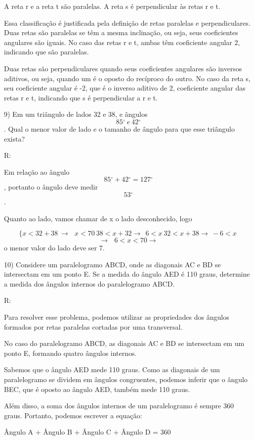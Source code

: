A reta r e a reta t são paralelas. A reta s é perpendicular às retas r e
t.

Essa classificação é justificada pela definição de retas paralelas e
perpendiculares. Duas retas são paralelas se têm a mesma inclinação, ou
seja, seus coeficientes angulares são iguais. No caso das retas r e t,
ambas têm coeficiente angular 2, indicando que são paralelas.

Duas retas são perpendiculares quando seus coeficientes angulares são
inversos aditivos, ou seja, quando um é o oposto do recíproco do outro.
No caso da reta s, seu coeficiente angular é -2, que é o inverso aditivo
de 2, coeficiente angular das retas r e t, indicando que s é
perpendicular a r e t.

9) Em um triângulo de lados 32 e 38, e ângulos
\[85{^\circ}\ e\ 42{^\circ}\]. Qual o menor valor de lado e o tamanho de
ângulo para que esse triângulo exista?

R:

Em relação ao ângulo \[85{^\circ} + 42{^\circ} = 127{^\circ}\], portanto
o ângulo deve medir \[53{^\circ}\].

Quanto ao lado, vamos chamar de x o lado desconhecido, logo

\[\{ x < 32 + 38\  \rightarrow \ \ \ x < 70\ 38 < x + 32 \rightarrow \ \ 6 < x\ 32 < x + 38 \rightarrow \  - 6 < x\ \]
\[\rightarrow \ \ \ 6 < x < 70 \rightarrow\] o menor valor do lado deve
ser 7.

10) Considere um paralelogramo ABCD, onde as diagonais AC e BD se
intersectam em um ponto E. Se a medida do ângulo AED é 110 graus,
determine a medida dos ângulos internos do paralelogramo ABCD.

R:

Para resolver esse problema, podemos utilizar as propriedades dos
ângulos formados por retas paralelas cortadas por uma transversal.

No caso do paralelogramo ABCD, as diagonais AC e BD se intersectam em um
ponto E, formando quatro ângulos internos.

Sabemos que o ângulo AED mede 110 graus. Como as diagonais de um
paralelogramo se dividem em ângulos congruentes, podemos inferir que o
ângulo BEC, que é oposto ao ângulo AED, também mede 110 graus.

Além disso, a soma dos ângulos internos de um paralelogramo é sempre 360
graus. Portanto, podemos escrever a equação:

Ângulo A + Ângulo B + Ângulo C + Ângulo D = 360

